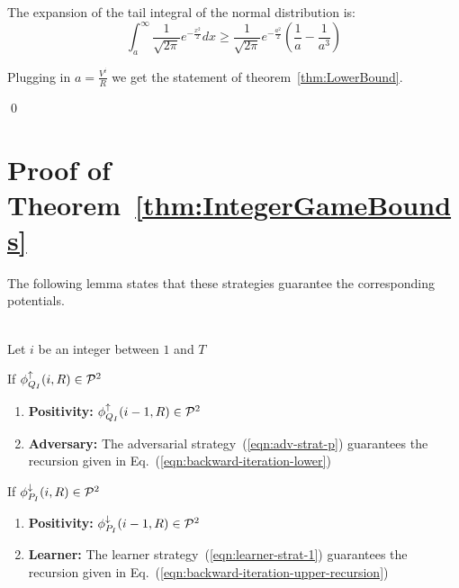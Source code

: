 \documentclass{article}[12pt]
\begin{document}
  The expansion of the tail integral of the normal distribution is:
  \[
    \int_a^\infty \frac{1}{\sqrt{2 \pi}} e^{-\frac{x^2}{2}} dx
    \geq \frac{1}{\sqrt{2 \pi}} e^{-\frac{a^2}{2}}
    \left( \frac{1}{a} - \frac{1}{a^3}\right)
  \]

Plugging in $a=\frac{V^i}{R}$ we get the statement of theorem~\ref{thm:LowerBound}.
  
  \qed

 




\appendix

\section{Proof of Theorem~\ref{thm:IntegerGameBounds}}


The following lemma states that these strategies guarantee the
corresponding potentials.
\begin{lemma} \label{lemma:first-order-bound}
~\\
Let $i$ be an integer between $1$ and $T$

If $\phi_{Q_I}^{\uparrow}(i,R) \in {\cal P}^{2}$
\begin{enumerate}
\item {\bf Positivity:} $\phi_{Q_I}^{\uparrow}(i-1,R) \in {\cal P}^{2}$
\item {\bf Adversary:} The adversarial strategy~(\ref{eqn:adv-strat-p})
  guarantees the recursion given in Eq.~(\ref{eqn:backward-iteration-lower})
\end{enumerate}

If $\phi_{P_I}^{\downarrow}(i,R) \in {\cal P}^{2}$
\begin{enumerate}
\item {\bf Positivity:} $\phi_{P_I}^{\downarrow}(i-1,R) \in {\cal P}^{2}$
\item {\bf Learner:} The learner strategy~(\ref{eqn:learner-strat-1})
  guarantees the recursion given in Eq.~(\ref{eqn:backward-iteration-upper-recursion})
\end{enumerate}

\end{lemma}

\end{document}
